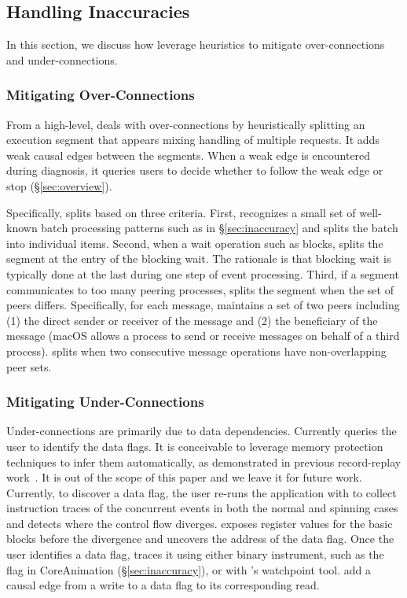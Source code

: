 \subsection{Handling Inaccuracies}

In this section, we discuss how \xxx leverage heuristics to mitigate
over-connections and under-connections.

\subsubsection{Mitigating Over-Connections}\label{subsec:fix-over}

From a high-level, \xxx deals with over-connections by heuristically splitting
an execution segment that appears mixing handling of multiple requests. It adds
weak causal edges between the segments. When a weak edge is encountered during
diagnosis, it queries users to decide whether to follow the weak edge or stop
(\S\ref{sec:overview}).

Specifically, \xxx splits based on three criteria. First, \xxx recognizes a small
set of well-known batch processing patterns such as 
in \S\ref{sec:inaccuracy} and splits the batch into individual items. Second,
when a wait operation such as  blocks, \xxx splits the segment at the
entry of the blocking wait. The rationale is that blocking wait is typically
done at the last during one step of event processing. Third, if a segment
communicates to too many peering processes, \xxx splits the segment when the
set of peers differs. Specifically, for each message, \xxx maintains a set
of two peers including (1) the direct sender or receiver of the message and
(2) the beneficiary of the message (macOS allows a process to send or receive
messages on behalf of a third process). \xxx splits when two consecutive message
operations have non-overlapping peer sets.

\subsubsection{Mitigating Under-Connections}\label{subsec:fix-under}

Under-connections are primarily due to data dependencies. Currently \xxx
queries the user to identify the data flags. It is conceivable to leverage
memory protection techniques to infer them automatically, as demonstrated in
previous record-replay work~\cite{king2005debugging, dunlap2008execution}. It
is out of the scope of this paper and we leave it for future work. Currently,
to discover a data flag, the user re-runs the application with \xxx to collect
instruction traces of the concurrent events in both the normal and spinning
cases and detects where the control flow diverges. \xxx exposes register
values for the basic blocks before the divergence and uncovers the address
of the data flag. Once the user identifies a data flag, \xxx traces it using
either binary instrument, such as the  flag in CoreAnimation
(\S\ref{sec:inaccuracy}), or with \xxx's watchpoint tool. \xxx add a causal edge
from a write to a data flag to its corresponding read.
